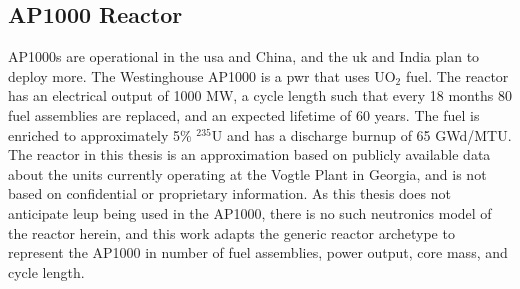 \subsection{AP1000 Reactor}
\label{sec:ap}

AP1000s are operational in the \gls{usa} and China, and the \gls{uk} and India plan to deploy more. The Westinghouse AP1000 is a \gls{pwr} that uses UO$_2$ fuel. The reactor has an electrical output of 1000 MW, a cycle length such that every 18 months 80 fuel assemblies are replaced, and an expected lifetime of 60 years. The fuel is enriched to approximately 5\% $^{235}$U and has a discharge burnup of 65 GWd/MTU. The reactor in this thesis is an approximation based on publicly available data about the units currently operating at the Vogtle Plant in Georgia, and is not based on confidential or proprietary information. As this thesis does not anticipate \gls{leup} being used in the AP1000, there is no such neutronics model of the reactor herein, and this work adapts the generic \cycamore reactor archetype to represent the AP1000 in number of fuel assemblies, power output, core mass, and cycle length.
